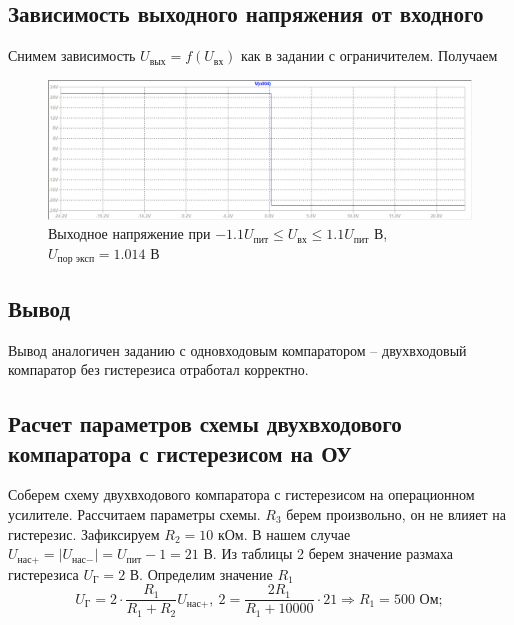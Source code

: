 \documentclass[a4paper, 12pt]{article}
\begin{document}
    \subsection{Зависимость выходного напряжения от входного}
    Снимем зависимость $U_\text{вых}=f\left( U_\text{вх} \right)$ как в задании с ограничителем.
    Получаем
    \begin{figure}[H]
        \centering
        \includegraphics[scale=0.46]{5task_fuin.png}
        \captionsetup{skip=0pt}
        \caption{Выходное напряжение при $-1.1U_\text{пит}\leq U_\text{вх}\leq 1.1U_\text{пит}$ В, $U_\text{пор эксп}=1.014$ В}
        \label{fig:5task_fuin}
    \end{figure}


    \subsection{Вывод}
    Вывод аналогичен заданию с одновходовым компаратором
    -- двухвходовый компаратор без гистерезиса
    отработал корректно.


    \subsection{Расчет параметров схемы двухвходового компаратора с гистерезисом на ОУ}
    Соберем схему двухвходового компаратора с гистерезисом на операционном
    усилителе. Рассчитаем параметры схемы. $R_3$ берем произвольно, он не
    влияет на гистерезис. Зафиксируем $R_2=10\text{ кОм}$. В нашем случае
    $U_{\text{нас}+}=|U_{\text{нас}-}|=U_\text{пит}-1=21$ В. Из
    таблицы 2 берем значение размаха гистерезиса $U_\text{Г}=2$ В. Определим значение $R_1$
    $$
    U_\text{Г}=2\cdot\dfrac{R_1}{R_1+R_2}U_{\text{нас}+},\ 2=\dfrac{2R_1}{R_1+10000}\cdot21\Rightarrow R_1=500\text{ Ом};
    $$
\end{document}
